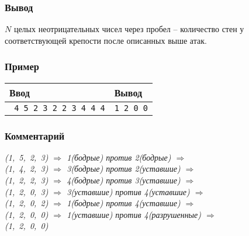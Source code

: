 \documentclass[10pt, a4paper]{article}
\newcommand{\outformat}[1]
{
	\subsubsection*{Вывод} #1
}
\newcommand{\example}[2]
{
	\subsubsection*{Пример}
	\noindent
	\begin{center}
	\begin{tabularx}{\linewidth}{|X|X|}
	\hline
	Ввод & Вывод \\
	\hline
	{\tt #1} & {\tt #2}		\\
	\hline
	\end{tabularx}
	\end{center}
}
\newcommand{\excomm}[1]
{
	\subsubsection*{Комментарий}
	\textit{#1}
}
\begin{document}
\outformat{$N$ целых неотрицательных чисел через пробел -- количество стен у соответствующей крепости после описанных выше атак.}

\example{%
4		\newline
1 5 2 3	\newline
6		\newline
1 2		\newline
3 2		\newline
4 3		\newline
3 4		\newline
1 4		\newline
1 4}%
{1 2 0 0}

\excomm{(1,~5,~2,~3) $\Rightarrow$ 1(бодрые) против 2(бодрые) $\Rightarrow$\\
(1,~4,~2,~3) $\Rightarrow$ 3(бодрые) против 2(уставшие) $\Rightarrow$\\
(1,~2,~2,~3) $\Rightarrow$ 4(бодрые) против 3(уставшие) $\Rightarrow$\\
(1,~2,~0,~3) $\Rightarrow$ 3(уставшие) против 4(уставшие) $\Rightarrow$\\
(1,~2,~0,~2) $\Rightarrow$ 1(бодрые) против 4(уставшие) $\Rightarrow$\\
(1,~2,~0,~0) $\Rightarrow$ 1(уставшие) против 4(разрушенные) $\Rightarrow$\\
(1,~2,~0,~0)}
\end{document}
